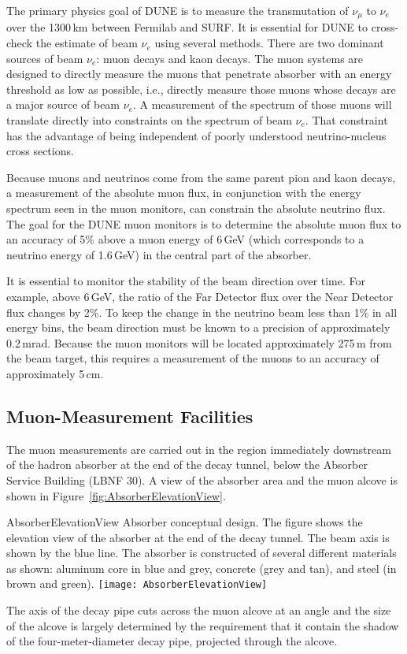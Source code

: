 The primary physics goal of DUNE is to measure the transmutation
of $\nu_\mu$ to $\nu_e$ over the 1300\,km between Fermilab
and SURF. It is essential for DUNE to cross-check the estimate of 
beam $\nu_e$ using several methods.
There are two dominant sources of beam $\nu_e$: muon decays and kaon decays. 
The muon systems are designed to directly measure the 
muons that penetrate absorber with an energy 
threshold as low as possible, i.e., directly measure those muons 
whose decays are a major source of beam $\nu_e$. 
A measurement of the spectrum of those muons will translate
 directly into constraints on the spectrum of beam $\nu_e$.
That constraint has the advantage of being independent of poorly understood 
neutrino-nucleus cross sections.

Because muons and neutrinos come from the same parent pion and kaon
decays, a measurement of the absolute muon flux, in conjunction with the energy spectrum
seen in the muon monitors, can constrain the absolute neutrino flux.  
The goal for the DUNE muon monitors is to determine the absolute muon flux
to an accuracy of 5\% above a muon energy of 6\,GeV (which corresponds to
a neutrino energy of 1.6\,GeV) in the central part of the absorber.

It is essential to monitor the stability of the beam direction over
time. For example, above 6\,GeV, the ratio of the Far Detector flux over 
the Near Detector flux changes by 2\%.  
To keep the change in the neutrino beam less than 1\% in all energy bins,
the beam direction must be known to a precision of approximately 0.2\,mrad. 
Because the muon monitors will be located approximately 275\,m
from the beam target, this requires a measurement of the muons to an
accuracy of approximately 5\,cm.

%
%
\subsection{Muon-Measurement Facilities}
\label{subsec:detectors-nd-blm-muon-measurement-facilities}

The muon measurements are carried out in the region immediately
downstream of the hadron absorber at the end of the decay tunnel, below
the Absorber Service Building (LBNF 30).  A view of the absorber area
and the muon alcove is shown in Figure~\ref{fig:AbsorberElevationView}.  
\begin{cdrfigure}{AbsorberElevationView}
{Absorber conceptual design. The figure shows the elevation view of the 
absorber at the end of the decay tunnel. The beam axis is shown by
the blue line. The absorber is constructed of several different 
materials as shown: aluminum core in blue and grey, concrete 
(grey and tan), and steel (in brown and green).}
\texttt{[image: AbsorberElevationView]}
\end{cdrfigure}
The axis of the decay pipe
cuts across the muon alcove at an angle and the size of the alcove is
largely determined by the requirement that it contain the shadow of
the four-meter-diameter decay pipe, projected through the alcove.

